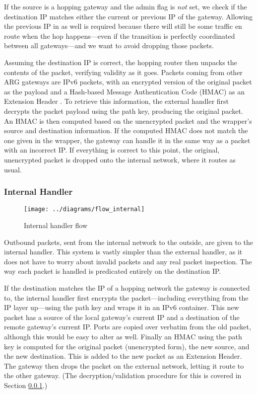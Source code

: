 \par If the source is a hopping gateway and the admin flag is \textit{not} set, we check if the destination IP matches either the current or previous IP of the gateway. Allowing the previous IP in as well is required because there will still be some traffic en route when the hop happens---even if the transition is perfectly coordinated between all gateways---and we want to avoid dropping those packets.

\par Assuming the destination IP is correct, the hopping router then unpacks the contents of the packet, verifying validity as it goes. Packets coming from other ARG gateways are IPv6 packets, with an encrypted version of the original packet as the payload and a Hash-based Message Authentication Code (HMAC) as an Extension Header \cite{rfc2460}. To retrieve this information, the external handler first decrypts the packet payload using the path key, producing the original packet. An HMAC is then computed based on the unencrypted packet and the wrapper's source and destination information. If the computed HMAC does not match the one given in the wrapper, the gateway can handle it in the same way as a packet with an incorrect IP. If everything is correct to this point, the original, unencrypted packet is dropped onto the internal network, where it routes as usual.

\subsubsection{Internal Handler}
\label{sec:internal_handler}

\begin{figure}
	\centering
	\texttt{[image: ../diagrams/flow\_internal]}
	\caption{Internal handler flow}
	\label{fig:flow_internal}
\end{figure}

\par Outbound packets, sent from the internal network to the outside, are given to the internal handler. This system is vastly simpler than the external handler, as it does not have to worry about invalid packets and any real packet inspection. The way each packet is handled is predicated entirely on the destination IP.

\par If the destination matches the IP of a hopping network the gateway is connected to, the internal handler first encrypts the packet---including everything from the IP layer up---using the path key and wraps it in an IPv6 container. This new packet has a source of the local gateway's current IP and a destination of the remote gateway's current IP. Ports are copied over verbatim from the old packet, although this would be easy to alter as well. Finally an HMAC using the path key is computed for the original packet (unencrypted form), the new source, and the new destination. This is added to the new packet as an Extension Header. The gateway then drops the packet on the external network, letting it route to the other gateway. (The decryption/validation procedure for this is covered in Section \ref{sec:internal_handler}.)

